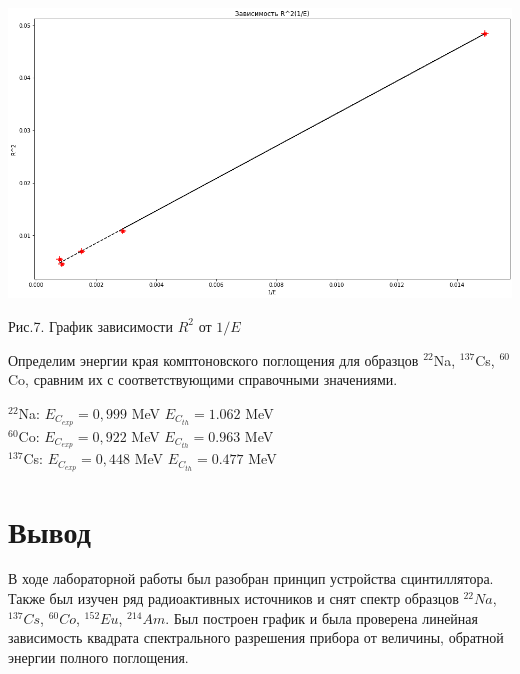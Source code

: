 \documentclass[14pt,a4paper]{scrartcl}
\begin{document}
\begin{center}
\includegraphics[scale=0.6]{grrrrr.png}\newline
\caption{Рис.7. График зависимости $R^2$ от $1/E$}
\end{center}

Определим энергии края комптоновского поглощения для образцов $^{22}$Na, $^{137}$Cs, $^{60}$Co, сравним их с соответствующими справочными значениями.
\begin{center}
$^{22}$Na: \hspace{1cm} $E_C_{exp} =0,999$ MeV \hspace{1cm} $E_C_{th} = 1.062$ MeV \\
  $^{60}$Co: \hspace{1cm} $E_C_{exp} = 0,922$ MeV \hspace{1cm} $E_C_{th} = 0.963$ MeV \\ 
$^{137}$Cs: \hspace{1cm} $E_C_{exp} =0,448$ MeV \hspace{1cm} $E_C_{th} = 0.477$ MeV \\

 \end{center}



\section{Вывод}



В ходе лабораторной работы был разобран принцип устройства сцинтиллятора. Также был изучен ряд радиоактивных источников и снят спектр образцов $^{22} Na$, $^{137} Cs$, $^{60} Co$, $^{152} Eu$, $^{214} Am$. Был построен график и была проверена линейная зависимость квадрата спектрального разрешения прибора от величины, обратной энергии полного поглощения.    
	
\end{document}
